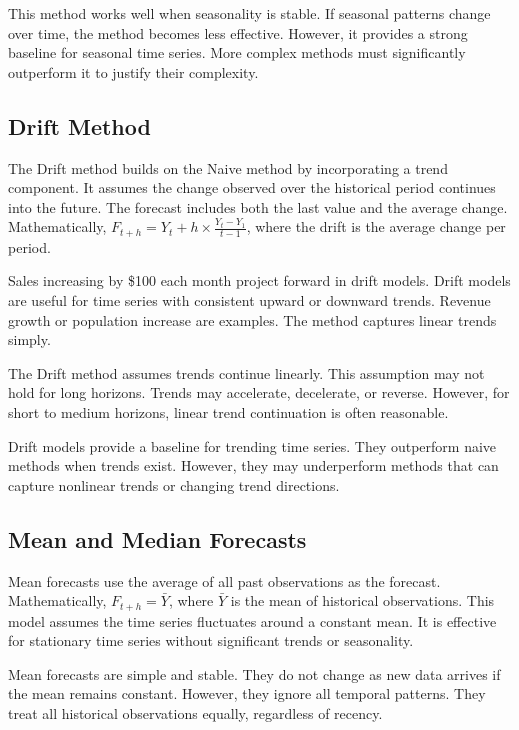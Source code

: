 This method works well when seasonality is stable. If seasonal patterns change over time, the method becomes less effective. However, it provides a strong baseline for seasonal time series. More complex methods must significantly outperform it to justify their complexity.

\subsection{Drift Method}

The Drift method builds on the Naive method by incorporating a trend component. It assumes the change observed over the historical period continues into the future. The forecast includes both the last value and the average change. Mathematically, \(F_{t+h} = Y_t + h \times \frac{Y_t - Y_1}{t-1}\), where the drift is the average change per period.

Sales increasing by \$100 each month project forward in drift models. Drift models are useful for time series with consistent upward or downward trends. Revenue growth or population increase are examples. The method captures linear trends simply.

The Drift method assumes trends continue linearly. This assumption may not hold for long horizons. Trends may accelerate, decelerate, or reverse. However, for short to medium horizons, linear trend continuation is often reasonable.

Drift models provide a baseline for trending time series. They outperform naive methods when trends exist. However, they may underperform methods that can capture nonlinear trends or changing trend directions.

\subsection{Mean and Median Forecasts}

Mean forecasts use the average of all past observations as the forecast. Mathematically, \(F_{t+h} = \bar{Y}\), where \(\bar{Y}\) is the mean of historical observations. This model assumes the time series fluctuates around a constant mean. It is effective for stationary time series without significant trends or seasonality.

Mean forecasts are simple and stable. They do not change as new data arrives if the mean remains constant. However, they ignore all temporal patterns. They treat all historical observations equally, regardless of recency.

